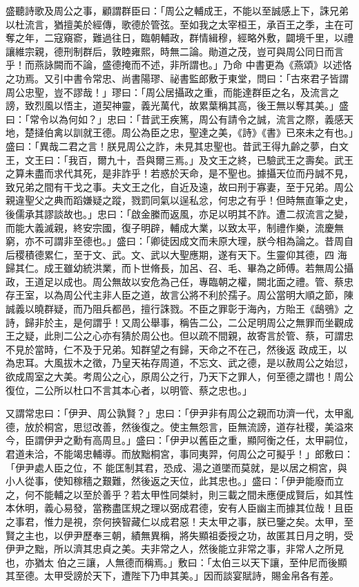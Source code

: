 \begin{pinyinscope}
 盛聽詩歌及周公之事，顧謂群臣曰：「周公之輔成王，不能以至誠感上下，誅兄弟以杜流言，猶擅美於經傳，歌德於管弦。至如我之太宰桓王，承百王之季，主在可奪之年，二寇窺窬，難過往日，臨朝輔政，群情緝穆，經略外敷，闢境千里，以禮讓維宗親，德刑制群后，敦睦雍熙，時無二論。勛道之茂，豈可與周公同日而言乎！而燕詠闕而不論，盛德掩而不述，非所謂也。」乃命
 中書更為《燕頌》以述恪之功焉。又引中書令常忠、尚書陽璆、祕書監郎敷于東堂，問曰：「古來君子皆謂周公忠聖，豈不謬哉！」璆曰：「周公居攝政之重，而能達群臣之名，及流言之謗，致烈風以悟主，道契神靈，義光萬代，故累葉稱其高，後王無以奪其美。」盛曰：「常令以為何如？」忠曰：「昔武王疾篤，周公有請令之誠，流言之際，義感天地，楚撻伯禽以訓就王德。周公為臣之忠，聖達之美，《詩》《書》已來未之有也。」盛曰：「異哉二君之言！朕見周公之詐，未見其忠聖也。昔武王得九齡之夢，白文王，文王曰：「我百，爾九十，吾與爾三焉。」及文王之終，已驗武王之壽矣。武王
 之算未盡而求代其死，是非詐乎！若惑於天命，是不聖也。據攝天位而丹誠不見，致兄弟之間有干戈之事。夫文王之化，自近及遠，故曰刑于寡妻，至于兄弟。周公親違聖父之典而蹈嫌疑之蹤，戮罰同氣以逞私忿，何忠之有乎！但時無直筆之史，後儒承其謬談故也。」忠曰：「啟金縢而返風，亦足以明其不詐。遭二叔流言之變，而能大義滅親，終安宗國，復子明辟，輔成大業，以致太平，制禮作樂，流慶無窮，亦不可謂非至德也。」盛曰：「卿徒因成文而未原大理，朕今相為論之。昔周自后稷積德累仁，至于文、武。文、武以大聖應期，遂有天下。生靈仰其德，四
 海歸其仁。成王雖幼統洪業，而卜世脩長，加呂、召、毛、畢為之師傅。若無周公攝政，王道足以成也。周公無故以安危為己任，專臨朝之權，闕北面之禮。管、蔡忠存王室，以為周公代主非人臣之道，故言公將不利於孺子。周公當明大順之節，陳誠義以曉群疑，而乃阻兵都邑，擅行誅戮。不臣之罪彰于海內，方貽王《鴟鴞》之詩，歸非於主，是何謂乎！又周公舉事，稱告二公，二公足明周公之無罪而坐觀成王之疑，此則二公之心亦有猜於周公也。但以疏不間親，故寄言於管、蔡，可謂忠不見於當時，仁不及于兄弟。知群望之有歸，天命之不在己，然後返
 政成王，以為忠耳。大風拔木之徵，乃皇天祐存周道，不忘文、武之德，是以赦周公之始愆，欲成周室之大美。考周公之心，原周公之行，乃天下之罪人，何至德之謂也！周公復位，二公所以杜口不言其本心者，以明管、蔡之忠也。」



 又謂常忠曰：「伊尹、周公孰賢？」忠曰：「伊尹非有周公之親而功濟一代，太甲亂德，放於桐宮，思愆改善，然後復之。使主無怨言，臣無流謗，道存社稷，美溢來今，臣謂伊尹之勳有高周旦。」盛曰：「伊尹以舊臣之重，顯阿衡之任，太甲嗣位，君道未洽，不能竭忠輔導。而放黜桐宮，事同夷羿，何周公之可擬乎！」郎敷曰：「伊尹處人臣之位，不
 能匡制其君，恐成、湯之道墜而莫就，是以居之桐宮，與小人從事，使知稼穡之艱難，然後返之天位，此其忠也。」盛曰：「伊尹能廢而立之，何不能輔之以至於善乎？若太甲性同桀紂，則三載之間未應便成賢后，如其性本休明，義心易發，當務盡匡規之理以弼成君德，安有人臣幽主而據其位哉！且臣之事君，惟力是視，奈何挾智藏仁以成君惡！夫太甲之事，朕已鑒之矣。太甲，至賢之主也，以伊尹歷奉三朝，績無異稱，將失顯祖委授之功，故匿其日月之明，受伊尹之黜，所以濟其忠貞之美。夫非常之人，然後能立非常之事，非常人之所見也，亦猶太
 伯之三讓，人無德而稱焉。」敷曰：「太伯三以天下讓，至仲尼而後顯其至德。太甲受謗於天下，遭陛下乃申其美。」因而談宴賦詩，賜金帛各有差。




\end{pinyinscope}
